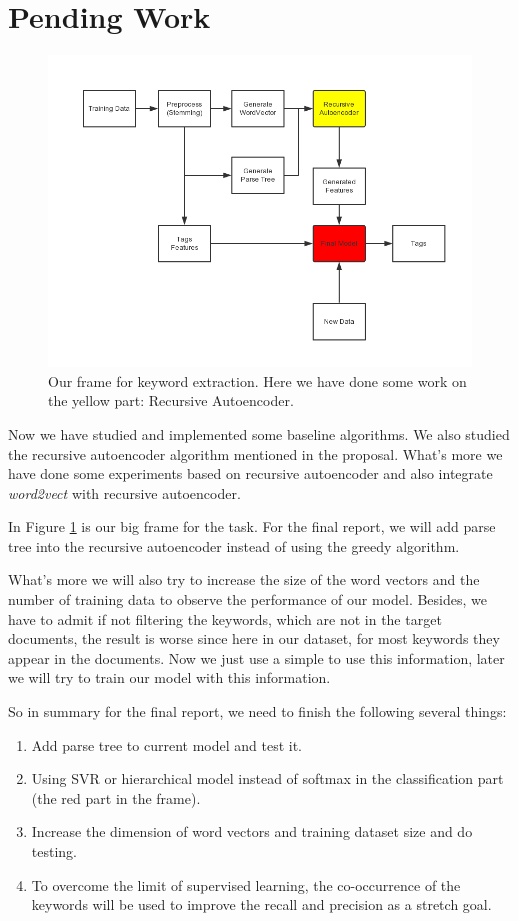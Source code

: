 \documentclass[dvips,9pt]{article}
\begin{document}
	\section{Pending Work}
    \begin{figure}
        \centering
        \includegraphics[scale=0.5]{DataFlow.png}
        \caption{Our frame for keyword extraction. Here we have done some work on the yellow part: Recursive Autoencoder.}
        \label{frame}
    \end{figure}
    Now we have studied and implemented some baseline algorithms. We also studied the recursive autoencoder algorithm mentioned in the proposal. What's more we have done some experiments based on recursive autoencoder and also integrate \emph{word2vect} with recursive autoencoder.
    
    In Figure \ref{frame} is our big frame for the task. For the final report, we will add parse tree into the recursive autoencoder instead of using the greedy algorithm.
    
    What's more we will also try to increase the size of the word vectors and the number of training data to observe the performance of our model. Besides, we have to admit if not filtering the keywords, which are not in the target documents, the result is worse since here in our dataset, for most keywords they appear in the documents. Now we just use a simple to use this information, later we will try to train our model with this information.
    
    So in summary for the final report, we need to finish the following several things:
    \begin{enumerate}
        \item Add parse tree to current model and test it.
        \item Using SVR or hierarchical model instead of softmax in the classification part (the red part in the frame).
        \item Increase the dimension of word vectors and training dataset size and do testing.
        \item To overcome the limit of supervised learning, the co-occurrence of the keywords will be used to improve the recall and precision as a stretch goal.
    \end{enumerate}
	
	
\end{document}
